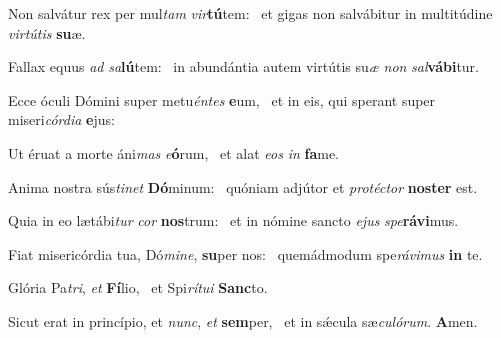 \item Non salvátur rex per mul\textit{tam} \textit{vir}\textbf{tú}tem:~\psstar{} et gigas non salvábitur in multitúdine \textit{virtútis} \textbf{su}æ.
\item Fallax equus \textit{ad} \textit{sa}\textbf{lú}tem:~\psstar{} in abundántia autem virtútis su\textit{æ} \textit{non} \textit{sal}\textbf{vá}\textbf{bi}tur.
\item Ecce óculi Dómini super metu\textit{éntes} \textbf{e}um,~\psstar{} et in eis, qui sperant super miseri\textit{córdia} \textbf{e}jus:
\item Ut éruat a morte áni\textit{mas} \textit{e}\textbf{ó}rum,~\psstar{} et alat \textit{eos} \textit{in} \textbf{fa}me.
\item Anima nostra sús\textit{tinet} \textbf{Dó}minum:~\psstar{} quóniam adjútor et \textit{protéctor} \textbf{nos}\textbf{ter} est.
\item Quia in eo lætábi\textit{tur} \textit{cor} \textbf{nos}trum:~\psstar{} et in nómine sancto \textit{ejus} \textit{spe}\textbf{rá}\textbf{vi}mus.
\item Fiat misericórdia tua, Dó\textit{mine}, \textbf{su}per nos:~\psstar{} quemádmodum spe\textit{rávimus} \textbf{in} te.
\item Glória Pa\textit{tri}, \textit{et} \textbf{Fí}lio,~\psstar{} et Spi\textit{rítui} \textbf{Sanc}to.
\item Sicut erat in princípio, et \textit{nunc}, \textit{et} \textbf{sem}per,~\psstar{} et in sǽcula sæ\textit{culórum}. \textbf{A}men.
